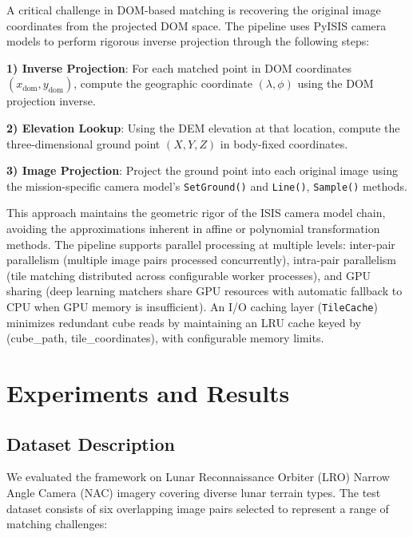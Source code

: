 \documentclass[lettersize,journal]{IEEEtran}
\newcommand{\pyisis}{PyISIS}
\begin{document}
A critical challenge in DOM-based matching is recovering the original image coordinates from the projected DOM space. The pipeline uses \pyisis{} camera models to perform rigorous inverse projection through the following steps:

\textbf{1) Inverse Projection}: For each matched point in DOM coordinates $(x_{\text{dom}}, y_{\text{dom}})$, compute the geographic coordinate $(\lambda, \phi)$ using the DOM projection inverse.

\textbf{2) Elevation Lookup}: Using the DEM elevation at that location, compute the three-dimensional ground point $(X, Y, Z)$ in body-fixed coordinates.

\textbf{3) Image Projection}: Project the ground point into each original image using the mission-specific camera model's \texttt{SetGround()} and \texttt{Line()}, \texttt{Sample()} methods.

This approach maintains the geometric rigor of the ISIS camera model chain, avoiding the approximations inherent in affine or polynomial transformation methods. The pipeline supports parallel processing at multiple levels: inter-pair parallelism (multiple image pairs processed concurrently), intra-pair parallelism (tile matching distributed across configurable worker processes), and GPU sharing (deep learning matchers share GPU resources with automatic fallback to CPU when GPU memory is insufficient). An I/O caching layer (\texttt{TileCache}) minimizes redundant cube reads by maintaining an LRU cache keyed by (cube\_path, tile\_coordinates), with configurable memory limits.


\section{Experiments and Results}\label{sec:experiments}

\subsection{Dataset Description}

We evaluated the framework on Lunar Reconnaissance Orbiter (LRO) Narrow Angle Camera (NAC) imagery covering diverse lunar terrain types. The test dataset consists of six overlapping image pairs selected to represent a range of matching challenges:
\end{document}
